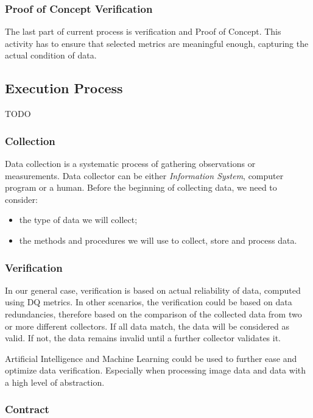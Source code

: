 \subsubsection{Proof of Concept Verification}

The last part of current process is verification and Proof of Concept.
This activity has to ensure that selected metrics are meaningful enough, capturing the actual condition of data.

\subsection{Execution Process}

TODO

\subsubsection{Collection}

Data collection is a systematic process of gathering observations or measurements.
Data collector can be either \textit{Information System}, computer program or a human.
Before the beginning of collecting data, we need to consider:

\begin{itemize}
    \item the type of data we will collect;
    \item the methods and procedures we will use to collect, store and process data.
\end{itemize}

\subsubsection{Verification}

In our general case, verification is based on actual reliability of data, computed using DQ metrics.
In other scenarios, the verification could be based on data redundancies, therefore based on the comparison of the collected data from two or more different collectors.
If all data match, the data will be considered as valid.
If not, the data remains invalid until a further collector validates it.

Artificial Intelligence and Machine Learning could be used to further ease and optimize data verification.
Especially when processing image data and data with a high level of abstraction.

\subsubsection{Contract}

